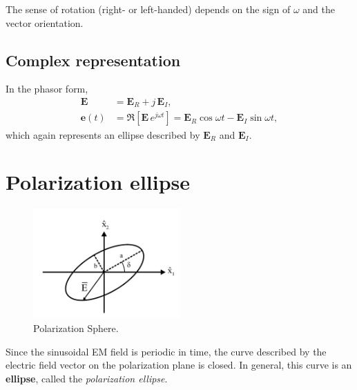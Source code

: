 The sense of rotation (right- or left-handed) depends on the sign of $\omega$ and the vector orientation.

\subsection*{Complex representation}

In the phasor form,
\begin{align}
    \mathbf{E} &= \mathbf{E}_R + j\,\mathbf{E}_I,\\
    \mathbf{e}(t) &= \Re\!\left[\mathbf{E}\,e^{j\omega t}\right]
    = \mathbf{E}_R\cos\omega t - \mathbf{E}_I\sin\omega t,
\end{align}
which again represents an ellipse described by $\mathbf{E}_R$ and $\mathbf{E}_I$.



\section{Polarization ellipse}

\begin{figure}[h]
    \centering
    \includegraphics[width=0.5\textwidth]{Pictures/PolarizationSphere.png}
    \caption{Polarization Sphere.}
\end{figure}

Since the sinusoidal EM field is periodic in time,  
the curve described by the electric field vector on the polarization plane is closed.  
In general, this curve is an \textbf{ellipse}, called the \emph{polarization ellipse}.

